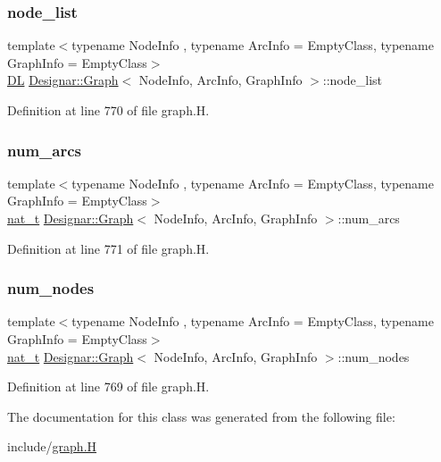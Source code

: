\subsubsection{\texorpdfstring{node\+\_\+list}{node\_list}}
{\footnotesize\ttfamily template$<$typename Node\+Info , typename Arc\+Info  = Empty\+Class, typename Graph\+Info  = Empty\+Class$>$ \\
\hyperlink{class_designar_1_1_d_l}{DL} \hyperlink{class_designar_1_1_graph}{Designar\+::\+Graph}$<$ Node\+Info, Arc\+Info, Graph\+Info $>$\+::node\+\_\+list\hspace{0.3cm}{\ttfamily [protected]}}



Definition at line 770 of file graph.\+H.

\mbox{\label{class_designar_1_1_graph_a035a0debf7a7545d0033f37cf941020f}} 
\subsubsection{\texorpdfstring{num\+\_\+arcs}{num\_arcs}}
{\footnotesize\ttfamily template$<$typename Node\+Info , typename Arc\+Info  = Empty\+Class, typename Graph\+Info  = Empty\+Class$>$ \\
\hyperlink{namespace_designar_aa72662848b9f4815e7bf31a7cf3e33d1}{nat\+\_\+t} \hyperlink{class_designar_1_1_graph}{Designar\+::\+Graph}$<$ Node\+Info, Arc\+Info, Graph\+Info $>$\+::num\+\_\+arcs\hspace{0.3cm}{\ttfamily [protected]}}



Definition at line 771 of file graph.\+H.

\mbox{\label{class_designar_1_1_graph_a1ff2ba87ab27911b1f6d47e622e67542}} 
\subsubsection{\texorpdfstring{num\+\_\+nodes}{num\_nodes}}
{\footnotesize\ttfamily template$<$typename Node\+Info , typename Arc\+Info  = Empty\+Class, typename Graph\+Info  = Empty\+Class$>$ \\
\hyperlink{namespace_designar_aa72662848b9f4815e7bf31a7cf3e33d1}{nat\+\_\+t} \hyperlink{class_designar_1_1_graph}{Designar\+::\+Graph}$<$ Node\+Info, Arc\+Info, Graph\+Info $>$\+::num\+\_\+nodes\hspace{0.3cm}{\ttfamily [protected]}}



Definition at line 769 of file graph.\+H.



The documentation for this class was generated from the following file\+:\begin{DoxyCompactItemize}
\item 
include/\hyperlink{graph_8_h}{graph.\+H}\end{DoxyCompactItemize}
